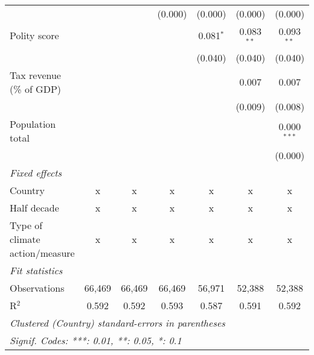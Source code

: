 \begin{tabular}{lcccccc}
                                                                              &             &                & (0.000)        & (0.000)        & (0.000)        & (0.000)\\   
   Polity score                                                               &             &                &                & 0.081$^{*}$    & 0.083$^{**}$   & 0.093$^{**}$\\   
                                                                              &             &                &                & (0.040)        & (0.040)        & (0.040)\\   
   Tax revenue (\% of GDP)                                                    &             &                &                &                & 0.007          & 0.007\\   
                                                                              &             &                &                &                & (0.009)        & (0.008)\\   
   Population total                                                           &             &                &                &                &                & 0.000$^{***}$\\   
                                                                              &             &                &                &                &                & (0.000)\\   
   \emph{Fixed effects}\\
   Country                                                                    & x           & x              & x              & x              & x              & x\\  
   Half decade                                                                & x           & x              & x              & x              & x              & x\\  
   Type of climate action/measure                                             & x           & x              & x              & x              & x              & x\\  
   \midrule \emph{Fit statistics}\\
   Observations                                                               & 66,469      & 66,469         & 66,469         & 56,971         & 52,388         & 52,388\\  
   R$^2$                                                                      & 0.592       & 0.592          & 0.593          & 0.587          & 0.591          & 0.592\\  
   \midrule
   \multicolumn{7}{l}{\emph{Clustered (Country) standard-errors in parentheses}}\\
   \multicolumn{7}{l}{\emph{Signif. Codes: ***: 0.01, **: 0.05, *: 0.1}}\\
\end{tabular}
\par\endgroup


